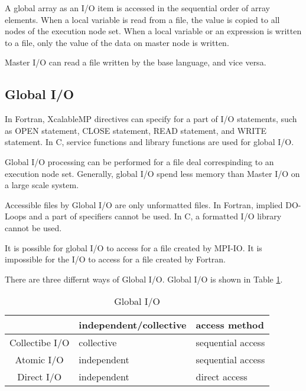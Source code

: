   A global array as an I/O item is accessed in the sequential order of
  array elements.
  When a local variable is read from a file, the value is copied to all
  nodes of the execution node set.
  When a local variable or an expression is written to a file, only the
  value of the data on master node is written.
  
  Master I/O can read a file written by the base language, and vice
  versa.
  

  \subsection{Global I/O}

  In Fortran, XcalableMP directives can specify for a part of I/O
  statements, such as OPEN statement, CLOSE statement, READ statement,
  and WRITE statement. 
  In C, service functions and library functions are used for global I/O.

  Global I/O processing can be performed for a file deal correspinding
  to an execution node set.
  Generally, global I/O spend less memory than Master I/O on a large
  scale system.

  Accessible files by Global I/O are only unformatted files. In Fortran,
  implied DO-Loops and a part of specifiers cannot be used.
  In C, a formatted I/O library cannot be used.

  It is possible for global I/O to access for a file created by
  MPI-IO. It is impossible for the I/O to access for a file created by
  Fortran.

  There are three differnt ways of Global I/O. Global I/O is shown in
  Table \ref{tb:global}. 

  \begin{table}[tb]
   \begin{center}
    \caption{Global I/O}
    \label{tb:global}
    \begin{tabular}{|c||l|l|}
     \hline 
     & independent/collective & access method  \\ \hline \hline
     Collectibe I/O & collective & sequential access \\ \hline
     Atomic I/O & independent & sequential access \\ \hline
     Direct I/O & independent & direct access \\ \hline
    \end{tabular}
   \end{center}
  \end{table}
  
